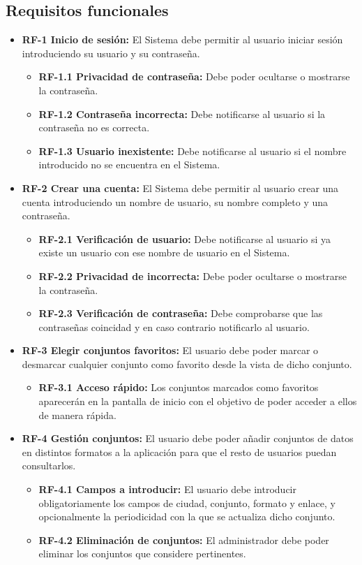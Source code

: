 \subsection{\textbf{Requisitos funcionales}}

\begin{itemize}
    \item \textbf{RF-1 Inicio de sesión:} El Sistema debe permitir al usuario iniciar sesión introduciendo su usuario y su contraseña.
    \begin{itemize}
        \item \textbf{RF-1.1 Privacidad de contraseña:} Debe poder ocultarse o mostrarse la contraseña.
        \item \textbf{RF-1.2 Contraseña incorrecta:} Debe notificarse al usuario si la contraseña no es correcta.
        \item \textbf{RF-1.3 Usuario inexistente:} Debe notificarse al usuario si el nombre introducido no se encuentra en el Sistema.
    \end{itemize}

    \item \textbf{RF-2 Crear una cuenta:} El Sistema debe permitir al usuario crear una cuenta introduciendo un nombre de usuario, su nombre completo y una contraseña.
    \begin{itemize}
        \item \textbf{RF-2.1 Verificación de usuario:} Debe notificarse al usuario si ya existe un usuario con ese nombre de usuario en el Sistema.
        \item \textbf{RF-2.2 Privacidad de incorrecta:} Debe poder ocultarse o mostrarse la contraseña.
        \item \textbf{RF-2.3 Verificación de contraseña:} Debe comprobarse que las contraseñas coincidad y en caso contrario notificarlo al usuario.
    \end{itemize}

    \item \textbf{RF-3 Elegir conjuntos favoritos:} El usuario debe poder marcar o desmarcar cualquier conjunto como favorito desde la vista de dicho conjunto.
    \begin{itemize}
        \item \textbf{RF-3.1 Acceso rápido:} Los conjuntos marcados como favoritos aparecerán en la pantalla de inicio con el objetivo de poder acceder a ellos de manera rápida.
    \end{itemize}

    \item \textbf{RF-4 Gestión conjuntos:} El usuario debe poder añadir conjuntos de datos en distintos formatos a la aplicación para que el resto de usuarios puedan consultarlos.
    \begin{itemize}
        \item \textbf{RF-4.1 Campos a introducir:} El usuario debe introducir obligatoriamente los campos de ciudad, conjunto, formato y enlace, y opcionalmente la periodicidad con la que se actualiza dicho conjunto.
        \item \textbf{RF-4.2 Eliminación de conjuntos:} El administrador debe poder eliminar los conjuntos que considere pertinentes.
    \end{itemize}


\end{itemize}
